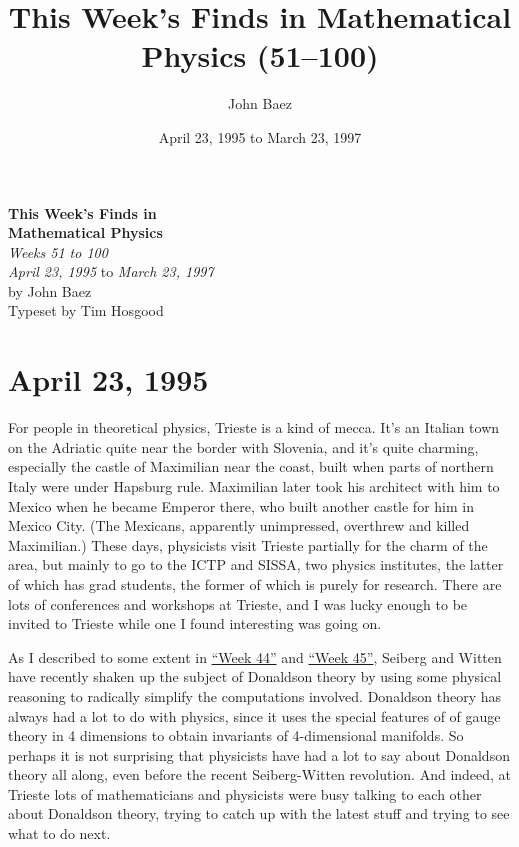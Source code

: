 \documentclass{article}
\title{This Week's Finds in Mathematical Physics (51--100)}
\author{John Baez}
\date{April 23, 1995 to March 23, 1997}
\begin{document}
\begin{titlepage}
  \begin{center}
    {\Huge\textbf{This Week's Finds in}}
  \\[0.7em]{\Huge\textbf{Mathematical Physics}}
  \\[1em]{\huge\textit{Weeks 51 to 100}}
  \\[4em]{\LARGE \textit{April 23, 1995} to \textit{March 23, 1997}}
  \\[4em]{\huge by John Baez}
  \\[0.5em]{\Large{Typeset by Tim Hosgood}}
  \end{center}
\end{titlepage}

\tableofcontents

\hypertarget{week51}{%
\section{April 23, 1995}\label{week51}}

For people in theoretical physics, Trieste is a kind of mecca. It's an
Italian town on the Adriatic quite near the border with Slovenia, and
it's quite charming, especially the castle of Maximilian near the coast,
built when parts of northern Italy were under Hapsburg rule. Maximilian
later took his architect with him to Mexico when he became Emperor
there, who built another castle for him in Mexico City. (The Mexicans,
apparently unimpressed, overthrew and killed Maximilian.) These days,
physicists visit Trieste partially for the charm of the area, but mainly
to go to the ICTP and SISSA, two physics institutes, the latter of which
has grad students, the former of which is purely for research. There are
lots of conferences and workshops at Trieste, and I was lucky enough to
be invited to Trieste while one I found interesting was going on.

As I described to some extent in \protect\hyperlink{week44}{``Week 44''}
and \protect\hyperlink{week45}{``Week 45''}, Seiberg and Witten have
recently shaken up the subject of Donaldson theory by using some
physical reasoning to radically simplify the computations involved.
Donaldson theory has always had a lot to do with physics, since it uses
the special features of of gauge theory in 4 dimensions to obtain
invariants of 4-dimensional manifolds. So perhaps it is not surprising
that physicists have had a lot to say about Donaldson theory all along,
even before the recent Seiberg-Witten revolution. And indeed, at Trieste
lots of mathematicians and physicists were busy talking to each other
about Donaldson theory, trying to catch up with the latest stuff and
trying to see what to do next.
\end{document}
